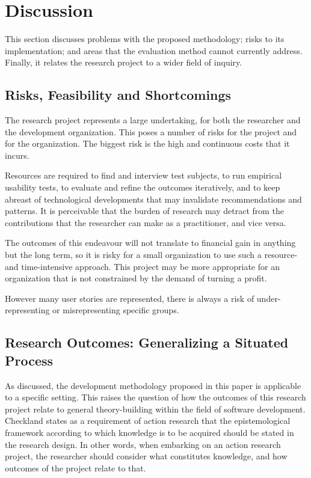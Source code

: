 \section{Discussion} %
\label{sec:discussion}

This section discusses problems with the proposed methodology; risks to its implementation; and areas that the evaluation method cannot currently address. Finally, it relates the research project to a wider field of inquiry.

\subsection{Risks, Feasibility and Shortcomings} %
\label{sub:risks_and_shortcomings_proposed_solution}

The research project represents a large undertaking, for both the researcher and the development organization. This poses a number of risks for the project and for the organization. The biggest risk is the high and continuous costs that it incurs.

Resources are required to find and interview test subjects, to run empirical usability tests, to evaluate and refine the outcomes iteratively, and to keep abreast of technological developments that may invalidate recommendations and patterns. It is perceivable that the burden of research may detract from the contributions that the researcher can make as a practitioner, and vice versa.

The outcomes of this endeavour will not translate to financial gain in anything but the long term, so it is risky for a small organization to use such a resource- and time-intensive approach. This project may be more appropriate for an organization that is not constrained by the demand of turning a profit.

However many user stories are represented, there is always a risk of under-representing or misrepresenting specific groups.

\subsection{Research Outcomes: Generalizing a Situated Process} %
\label{sub:research_outcomes_situated_theory}
As discussed, the development methodology proposed in this paper is applicable to a specific setting. This raises the question of how the outcomes of this research project relate to general theory-building within the field of software development. Checkland \cite{Checkland:1998} states as a requirement of action research that the epistemological framework according to which knowledge is to be acquired should be stated in the research design. In other words, when embarking on an action research project, the researcher should consider what constitutes knowledge, and how outcomes of the project relate to that.

